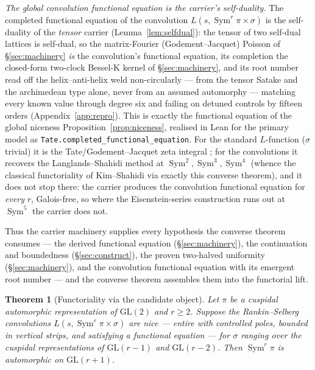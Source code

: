 \documentclass[11pt]{article}
\newtheorem{theorem}{Theorem}
\theoremstyle{definition}
\newcommand{\Sym}{\operatorname{Sym}}
\begin{document}
\emph{The global convolution functional equation is the carrier's self-duality.} The completed functional
equation of the convolution $L(s,\Sym^r\pi\times\sigma)$ is the self-duality of the \emph{tensor} carrier
(Lemma~\ref{lem:selfdual}): the tensor of two self-dual lattices is self-dual, so the matrix-Fourier
(Godement--Jacquet) Poisson of \S\ref{sec:machinery} \emph{is} the convolution's functional equation, its
completion the closed-form two-clock Bessel-K kernel of \S\ref{sec:machinery}, and its root number read off
the helix--anti-helix weld non-circularly --- from the tensor Satake and the archimedean type alone, never
from an assumed automorphy --- matching every known value through degree six and failing on detuned controls
by fifteen orders (Appendix~\ref{app:repro}). This is exactly the functional equation of the global niceness
Proposition~\ref{prop:niceness}, realised in Lean for the primary model as
\texttt{Tate.completed\_functional\_equation}. For the standard $L$-function ($\sigma$ trivial) it is the
Tate/Godement--Jacquet zeta integral \cite{Tate,GJa}; for the convolutions it recovers the
Langlands--Shahidi method \cite{Shahidi} at $\Sym^2,\Sym^3,\Sym^4$ (whence the classical functoriality of
Kim--Shahidi \cite{KimShahidi} via exactly this converse theorem), and it does not stop there: the carrier
produces the convolution functional equation for \emph{every} $r$, Galois-free, so where the
Eisenstein-series construction runs out at $\Sym^5$ the carrier does not.

Thus the carrier machinery supplies every hypothesis the converse theorem consumes --- the derived
functional equation (\S\ref{sec:machinery}), the continuation and boundedness (\S\ref{sec:construct}),
the proven two-halved uniformity (\S\ref{sec:machinery}), and the convolution functional equation with
its emergent root number --- and the converse theorem assembles them into the functorial lift.

\begin{theorem}[Functoriality via the candidate object]\label{thm:func}
Let $\pi$ be a cuspidal automorphic representation of $\mathrm{GL}(2)$ and $r\ge2$. Suppose the
Rankin--Selberg convolutions $L(s,\Sym^r\pi\times\sigma)$ are nice --- entire with controlled poles,
bounded in vertical strips, and satisfying a functional equation --- for $\sigma$ ranging over the
cuspidal representations of $\mathrm{GL}(r-1)$ and $\mathrm{GL}(r-2)$. Then $\Sym^r\pi$ is automorphic
on $\mathrm{GL}(r+1)$.
\end{theorem}
\end{document}
